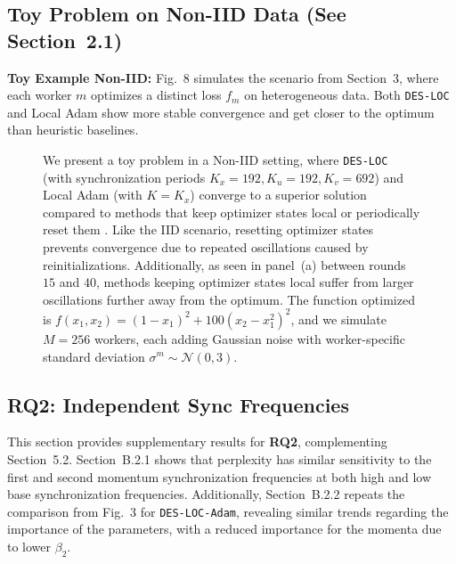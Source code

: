 \subsection{Toy Problem on Non-IID Data (See Section~2.1)}
\label{sec:b1_toy_noniid}

\textbf{Toy Example Non-IID:} Fig.~8 simulates the scenario from Section~3, where each worker $m$ optimizes a distinct loss $f_m$ on heterogeneous data. Both \texttt{DES-LOC} and Local Adam show more stable convergence and get closer to the optimum than heuristic baselines.

\begin{figure}[ht]
\centering
\caption{We present a toy problem in a Non-IID setting, where \texttt{DES-LOC} (with synchronization periods $K_x=192, K_u=192, K_v=692$) and Local Adam (with $K=K_x$) converge to a superior solution compared to methods that keep optimizer states local \citep{Douillard2023,Sani2025} or periodically reset them \citep{Sani2024,Iacob2025}. Like the IID scenario, resetting optimizer states prevents convergence due to repeated oscillations caused by reinitializations. Additionally, as seen in panel~(a) between rounds $15$ and $40$, methods keeping optimizer states local suffer from larger oscillations further away from the optimum. The function optimized is $f(x_1,x_2)=(1-x_1)^2+100(x_2-x_1^2)^2$, and we simulate $M=256$ workers, each adding Gaussian noise with worker-specific standard deviation $\sigma^m \sim \mathcal{N}(0,3)$.}
\label{fig:8}
\end{figure}

\subsection{RQ2: Independent Sync Frequencies}
\label{sec:b2_sync_freq}

This section provides supplementary results for \textbf{RQ2}, complementing Section~5.2. Section~B.2.1 shows that perplexity has similar sensitivity to the first and second momentum synchronization frequencies at both high and low base synchronization frequencies. Additionally, Section~B.2.2 repeats the comparison from Fig.~3 for \texttt{DES-LOC-Adam}, revealing similar trends regarding the importance of the parameters, with a reduced importance for the momenta due to lower $\beta_2$.

